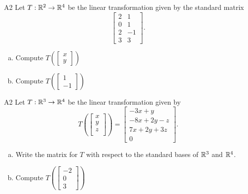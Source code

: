 \begin{problem}{A2}
Let $T: \mathbb{R}^2\rightarrow \mathbb{R}^4$ be the linear transformation given by the standard matrix
\[ \begin{bmatrix}
2 & 1   \\ 0 & 1  \\ 2 & -1  \\ 3 & 3  
\end{bmatrix}. \]
\begin{enumerate}[(a)]
\item Compute \( T\left( \begin{bmatrix}x\\ y  \end{bmatrix} \right) \)
\item Compute \(T\left( \begin{bmatrix}  1 \\ -1 \end{bmatrix}\right)\)
\end{enumerate}
\end{problem}

\begin{problem}{A2}
Let $T: \mathbb{R}^3\rightarrow \mathbb{R}^4$ be the linear transformation given by $$T\left(\begin{bmatrix} x \\ y \\ z \\  \end{bmatrix} \right) = \begin{bmatrix} -3x+y \\ -8x+2y-z \\ 7x+2y+3z \\ 0 \end{bmatrix}.$$  
\begin{enumerate}[(a)]
\item Write the matrix for $T$ with respect to the standard bases of $\mathbb{R}^3$ and $\mathbb{R}^4$.
\item Compute \( T\left( \begin{bmatrix}-2 \\ 0 \\ 3 \end{bmatrix} \right) \)
\end{enumerate}
\end{problem}

